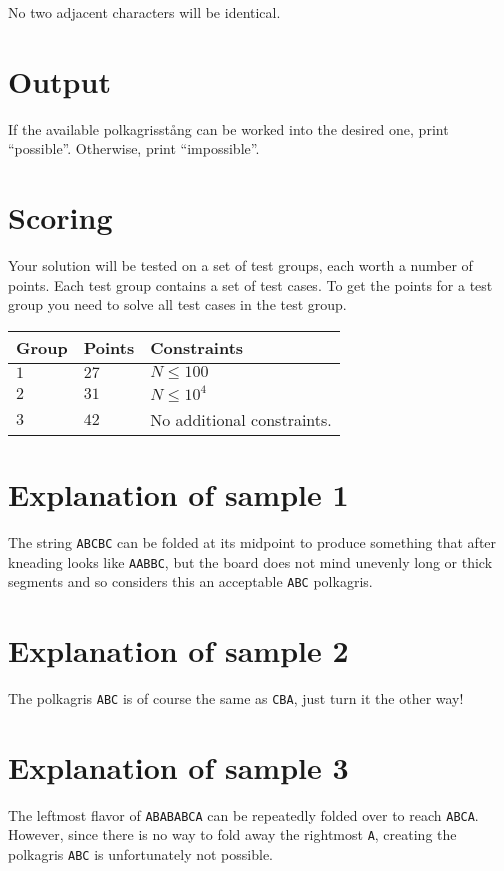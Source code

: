 No two adjacent characters will be identical.

\section*{Output}
If the available polkagrisstång can be worked into the desired one, print ``possible''. Otherwise, print ``impossible''.

\section*{Scoring}
Your solution will be tested on a set of test groups, each worth a number of points. Each test group contains
a set of test cases. To get the points for a test group you need to solve all test cases in the test group.

\noindent
\begin{tabular}{| l | l | p{12cm} |}
  \hline
  \textbf{Group} & \textbf{Points} & \textbf{Constraints} \\ \hline
  $1$    & $27$       & $N \leq 100$ \\ \hline
  $2$    & $31$       & $N \leq 10^4$ \\ \hline
  $3$    & $42$       & No additional constraints. \\ \hline
\end{tabular}

\section*{Explanation of sample 1}

The string \verb|ABCBC| can be folded at its midpoint to produce something that after kneading looks
like \verb|AABBC|, but the board does not mind unevenly long or thick segments and so considers this
an acceptable \verb|ABC| polkagris.

\section*{Explanation of sample 2}

The polkagris \verb|ABC| is of course the same as \verb|CBA|, just turn it the other way!

\section*{Explanation of sample 3}

The leftmost flavor of \verb|ABABABCA| can be repeatedly folded over to reach \verb|ABCA|. However,
since there is no way to fold away the rightmost \verb|A|, creating the polkagris \verb|ABC| is
unfortunately not possible.
